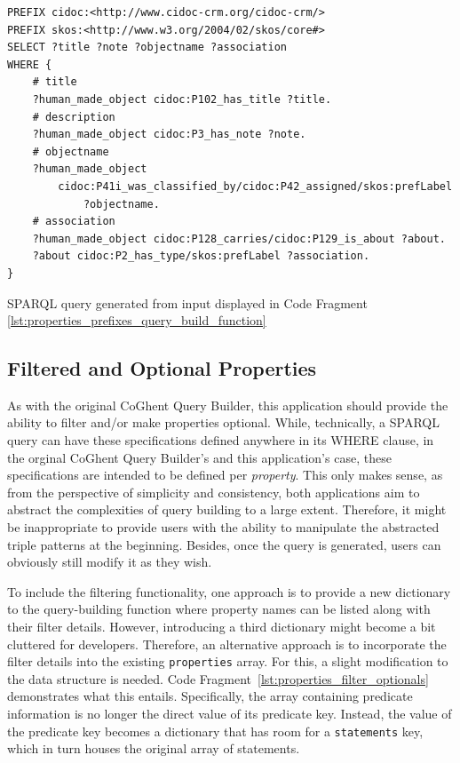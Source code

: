 \begin{listing}[htbp]
    \begin{verbatim}
PREFIX cidoc:<http://www.cidoc-crm.org/cidoc-crm/>
PREFIX skos:<http://www.w3.org/2004/02/skos/core#>
SELECT ?title ?note ?objectname ?association
WHERE {
    # title
    ?human_made_object cidoc:P102_has_title ?title.
    # description
    ?human_made_object cidoc:P3_has_note ?note.
    # objectname
    ?human_made_object
        cidoc:P41i_was_classified_by/cidoc:P42_assigned/skos:prefLabel
            ?objectname.
    # association
    ?human_made_object cidoc:P128_carries/cidoc:P129_is_about ?about.
    ?about cidoc:P2_has_type/skos:prefLabel ?association.
}
    \end{verbatim}
    \caption{SPARQL query generated from input displayed in Code Fragment \ref{lst:properties_prefixes_query_build_function}}
    \label{lst:query_generated_edge_cases}
\end{listing}

\subsection{Filtered and Optional Properties}
\label{subsec:filter_optional_properties}

As with the original CoGhent Query Builder, this application should provide the ability to filter and/or make properties optional. While, technically, a SPARQL query can have these specifications defined anywhere in its WHERE clause, in the orginal CoGhent Query Builder's and this application's case, these specifications are intended to be defined per \textit{property}. This only makes sense, as from the perspective of simplicity and consistency, both applications aim to abstract the complexities of query building to a large extent. Therefore, it might be inappropriate to provide users with the ability to manipulate the abstracted triple patterns at the beginning. Besides, once the query is generated, users can obviously still modify it as they wish.

To include the filtering functionality, one approach is to provide a new dictionary to the query-building function where property names can be listed along with their filter details. However, introducing a third dictionary might become a bit cluttered for developers. Therefore, an alternative approach is to incorporate the filter details into the existing \texttt{properties} array. For this, a slight modification to the data structure is needed. Code Fragment~\ref{lst:properties_filter_optionals} demonstrates what this entails. Specifically, the array containing predicate information is no longer the direct value of its predicate key. Instead, the value of the predicate key becomes a dictionary that has room for a \texttt{statements} key, which in turn houses the original array of statements.


